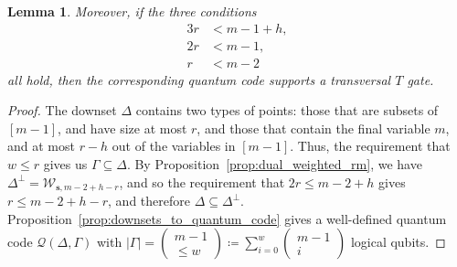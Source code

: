 \documentclass{article}
\newcounter{main}[section]
\newtheorem{lemma}[main]{Lemma}
\begin{document}
\begin{lemma}
Moreover, if the three conditions
\begin{align}
    3r &< m-1+h,\label{eq:weighted_divis_condition_first}\\
    2r &< m-1,\\
    r &< m-2\label{eq:weighted_divis_condition_last}
\end{align}
all hold, then the corresponding quantum code supports a transversal $T$ gate.
\end{lemma}
\begin{proof}
    The downset $\Delta$ contains two types of points: those that are subsets of $[m-1]$, and have size at most $r$, and those that contain the final variable $m$, and at most $r-h$ out of the variables in $[m-1]$. Thus, the requirement that $w \leq r$ gives us $\Gamma \subseteq \Delta$. By Proposition~\ref{prop:dual_weighted_rm}, we have $\Delta^\perp = \mathcal{W}_{\boldsymbol{s},m-2+h-r}$, and so the requirement that $2r \leq m-2+h$ gives $r \leq m-2+h-r$, and therefore $\Delta \subseteq \Delta^\perp$. Proposition~\ref{prop:downsets_to_quantum_code} gives a well-defined quantum code $\mathcal{Q}(\Delta,\Gamma)$ with $|\Gamma| = \left(\begin{smallmatrix}m-1\\\leq w\end{smallmatrix}\right) \coloneq \sum_{i=0}^w\left(\begin{smallmatrix}m-1\\i\end{smallmatrix}\right)$ logical qubits.


\end{proof}
\end{document}
